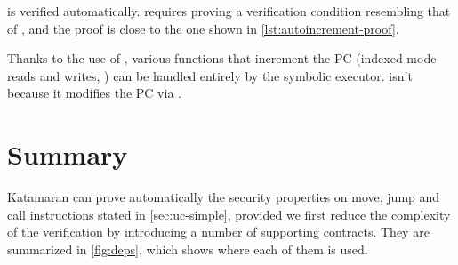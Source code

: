  is verified automatically.  requires proving a verification condition resembling that of , and the proof is close to the one shown in \cref{lst:autoincrement-proof}.

Thanks to the use of , various functions that increment the PC (indexed-mode reads and writes, ) can be handled entirely by the symbolic executor.  isn't because it modifies the PC via .

\section{Summary}

Katamaran can prove automatically the security properties on move, jump and call instructions stated in \cref{sec:uc-simple}, provided we first reduce the complexity of the verification by introducing a number of supporting contracts. They are summarized in \cref{fig:deps}, which shows where each of them is used.

